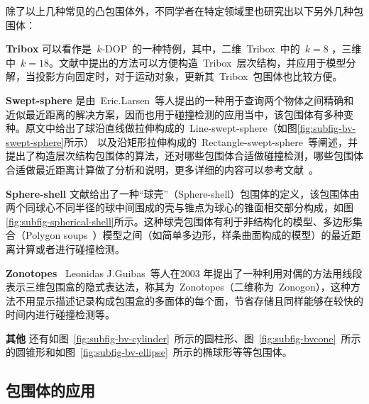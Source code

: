 除了以上几种常见的凸包围体外，不同学者在特定领域里也研究出以下另外几种包围体：\\
\begin{inparaenum}[(1)]
\indent
\item \textbf{Tribox} 可以看作是~$k$-DOP~的一种特例，其中，二维~Tribox~中的~$k=8$ ，三维中~$k=18$。文献中提出的方法可以方便构造~Tribox~层次结构，并应用于模型分解，当投影方向固定时，对于运动对象，更新其~Tribox~包围体也比较方便。 \\ 
\indent
\item \textbf{Swept-sphere}
是由~Eric.Larsen~等人\cite{Larsen1999Fast}提出的一种用于查询两个物体之间精确和近似最近距离的解决方案，因而也用于碰撞检测的应用当中，该包围体有多种变种。原文中给出了球沿直线做拉伸构成的~Line-swept-sphere（如图\ref{fig:subfig-bv-swept-sphere}所示）
以及沿矩形拉伸构成的~Rectangle-swept-sphere~等阐述，并提出了构造层次结构包围体的算法，还对哪些包围体合适做碰撞检测，哪些包围体合适做最近距离计算做了分析和说明，更多详细的内容可以参考文献~。\\
\indent
\item \textbf{Sphere-shell}
文献给出了一种“球壳”（Sphere-shell）包围体的定义，该包围体由两个同球心不同半径的球中间围成的壳与锥点为球心的锥面相交部分构成，如图\ref{fig:subfig-spherical-shell}所示。这种球壳包围体有利于非结构化的模型、多边形集合（Polygon
soups~）模型之间（如简单多边形，样条曲面构成的模型）的最近距离计算或者进行碰撞检测。\\
\indent
\item \textbf{Zonotopes} ~Leonidas
J.Guibas~\cite{Guibas2003Zonotopes}等人在2003 年提出了一种利用对偶的方法用线段表示三维包围盒的隐式表达法，称其为~Zonotopes（二维称为~Zonogon），这种方法不用显示描述记录构成包围盒的多面体的每个面，节省存储且同样能够在较快的时间内进行碰撞检测等。\\
\indent
\item \textbf{其他}
还有如图~\ref{fig:subfig-bv-cylinder}~所示的圆柱形\cite{Schomer2000Smallest}、图~\ref{fig:subfig-bvcone}~所示的圆锥形\cite{held1997erit}和如图~\ref{fig:subfig-bv-ellipse}~所示的椭球形\cite{Wang2004Efficient,hebing2009}等等包围体。
\end{inparaenum}

\subsection{包围体的应用}
\label{subsec:bv:application}

